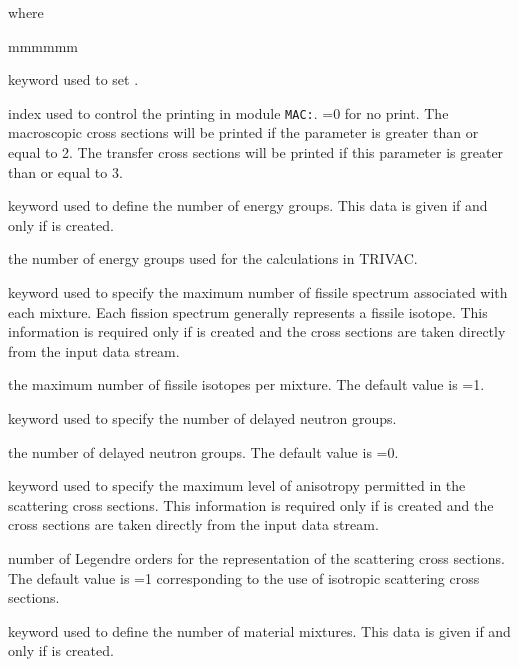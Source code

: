 \noindent where
\begin{ListeDeDescription}{mmmmmm}

\item[\moc{EDIT}] keyword used to set .

\item[\dusa{iprint}] index used to control the printing in module {\tt MAC:}. =0 for no print. The macroscopic cross sections will be printed if the parameter  is greater than or equal to 2. The transfer cross sections will be printed if this parameter is greater than or equal to 3.

\item[\moc{NGRO}] keyword used to  define the number of energy groups. This
data is given if and only if  is created.

\item[\dusa{ngroup}] the number of energy groups used for the calculations in TRIVAC. 

\item[\moc{NIFI}] keyword used to specify the maximum number of fissile
spectrum associated with each mixture. Each fission spectrum generally
represents a fissile isotope. This information is required only if 
is created and the cross sections are taken directly from the input data stream.

\item[\dusa{nifiss}] the maximum number of fissile isotopes per mixture. The
default value is =1.

\item[\moc{DELP}] keyword used to specify the number of delayed neutron groups.

\item[\dusa{ndel}] the number of delayed neutron groups. The
default value is =0.

\item[\moc{ANIS}] keyword used to specify the maximum level of anisotropy
permitted in the scattering cross sections. This information is required only if
 is created and the cross sections are taken directly from the
input data stream.

\item[\dusa{naniso}] number of Legendre orders for the representation of the
scattering cross sections. The default value is =1 corresponding to
the use of isotropic scattering cross sections.

\item[\moc{NMIX}] keyword used to define the number of material mixtures. 
This data is given if and only if  is created.


\end{ListeDeDescription}
